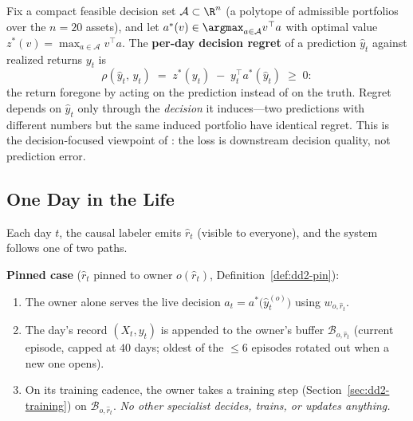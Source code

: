 \begin{definition}
\label{def:dd2-regret}
Fix a compact feasible decision set $\mathcal{A} \subset \R^{n}$ (a polytope
of admissible portfolios over the $n = 20$ assets), and let
$a^{*}(v) \in \argmax_{a \in \mathcal{A}} v^{\top} a$ with optimal value
$z^{*}(v) = \max_{a \in \mathcal{A}} v^{\top} a$. The \textbf{per-day
decision regret} of a prediction $\hat y_t$ against realized returns $y_t$ is
\begin{equation}
\label{eq:dd2-regret}
\rho(\hat y_t,\, y_t) \;=\; z^{*}(y_t) \;-\; y_t^{\top} a^{*}(\hat y_t)
\;\ge\; 0:
\end{equation}
the return foregone by acting on the prediction instead of on the truth.
Regret depends on $\hat y_t$ only through the \emph{decision} it induces---two
predictions with different numbers but the same induced portfolio have
identical regret. This is the decision-focused viewpoint of
\citet{elmachtoub2022smart}: the loss is downstream decision quality, not
prediction error.
\end{definition}

\subsection{One Day in the Life}

Each day $t$, the causal labeler emits $\hat r_t$ (visible to everyone), and
the system follows one of two paths.

\textbf{Pinned case} ($\hat r_t$ pinned to owner $o(\hat r_t)$,
Definition~\ref{def:dd2-pin}):
\begin{enumerate}
  \item The owner alone serves the live decision
        $a_t = a^{*}\bigl(\hat y^{(o)}_t\bigr)$ using $w_{o, \hat r_t}$.
  \item The day's record $(X_t, y_t)$ is appended to the owner's buffer
        $\mathcal{B}_{o, \hat r_t}$ (current episode, capped at $40$ days;
        oldest of the $\le 6$ episodes rotated out when a new one opens).
  \item On its training cadence, the owner takes a training step
        (Section~\ref{sec:dd2-training}) on $\mathcal{B}_{o, \hat r_t}$.
        \emph{No other specialist decides, trains, or updates anything.}
\end{enumerate}

